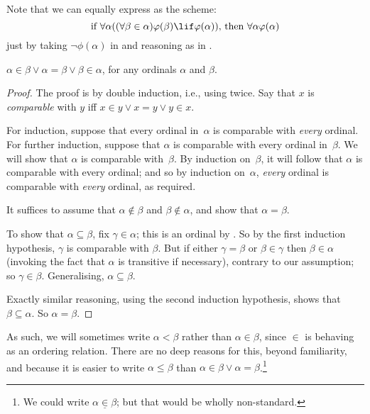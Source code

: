 \documentclass[../../../include/open-logic-section]{subfiles}
\begin{document}
Note that we can equally express  as the
scheme:
\[
\text{if }\forall \alpha((\forall \beta \in \alpha)\phi(\beta) \lif 
\phi(\alpha))\text{, then }\forall \alpha\phi(\alpha)
\]
just by taking $\lnot\phi(\alpha)$ in  and reasoning as in .

\begin{thm}[Trichotomy] 
$\alpha \in \beta \lor \alpha = \beta \lor \beta \in \alpha$, for any
ordinals $\alpha$ and $\beta$. 
\end{thm}

\begin{proof}
The proof is by double induction, i.e., using
 twice. Say that $x$ is \emph{comparable}
with $y$ iff $x \in y \lor x = y \lor y \in x$. 

For induction, suppose that every ordinal in~$\alpha$ is comparable
with \emph{every} ordinal. For further induction, suppose that
$\alpha$ is comparable with every ordinal in~$\beta$. We will show that
$\alpha$ is comparable with~$\beta$. By induction on~$\beta$, it will
follow that $\alpha$ is comparable with every ordinal; and so by
induction on~$\alpha$, \emph{every} ordinal is comparable with
\emph{every} ordinal, as required. 

It suffices to assume that $\alpha \notin \beta$ and $\beta \notin
\alpha$, and show that $\alpha = \beta$. 

To show that $\alpha \subseteq \beta$, fix $\gamma \in \alpha$; this
is an ordinal by . So by the first induction
hypothesis, $\gamma$ is comparable with $\beta$. But if either $\gamma
= \beta$ or $\beta \in \gamma$ then $\beta \in \alpha$ (invoking the
fact that $\alpha$ is transitive if necessary), contrary to our
assumption; so $\gamma \in \beta$. Generalising, $\alpha \subseteq
\beta$.

Exactly similar reasoning, using the second induction hypothesis,
shows that $\beta \subseteq \alpha$. So $\alpha = \beta$.
\end{proof}\noindent As such, we will sometimes write $\alpha <\beta$
rather than $\alpha \in \beta$, since $\in$ is behaving as an ordering
relation. There are no deep reasons for this, beyond familiarity, and
because it is easier to write $\alpha \leq \beta$ than $\alpha \in
\beta \lor \alpha = \beta$.\footnote{We could write $\alpha
\mathrel{\underline{\in}} \beta$; but that would be wholly
non-standard.}
\end{document}
